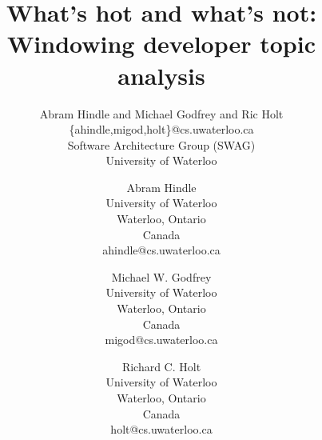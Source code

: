 \documentclass[times, 10pt,twocolumn]{article}
\author{Abram Hindle and Michael Godfrey and Ric Holt \\
\{ahindle,migod,holt\}@cs.uwaterloo.ca\\
Software Architecture Group (SWAG)\\
University of Waterloo\\
}
\title{What's hot and what's not:\\Windowing developer topic analysis}
\begin{document}
\newcommand{\affaddr}[1]{#1}
\newcommand{\aemail}[1]{#1}
\author{
Abram Hindle\\
\affaddr{University of Waterloo}\\
\affaddr{Waterloo, Ontario}\\
\affaddr{Canada}\\
\aemail{ahindle@cs.uwaterloo.ca}
\and
Michael W. Godfrey\\
\affaddr{University of Waterloo}\\
\affaddr{Waterloo, Ontario}\\
\affaddr{Canada}\\
\aemail{migod@cs.uwaterloo.ca}
\and
Richard C. Holt\\
\affaddr{University of Waterloo}\\
\affaddr{Waterloo, Ontario}\\
\affaddr{Canada}\\
\aemail{holt@cs.uwaterloo.ca}
}
\end{document}

